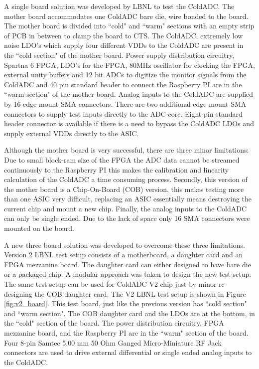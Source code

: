 \label{sec:2.4}


A single board solution was developed by LBNL to test the ColdADC. The mother board accommodates one ColdADC bare die, wire bonded to the board. The mother board is divided into ``cold" and ``warm" sections with an empty strip of PCB in between to clamp the board to CTS. The ColdADC, extremely low noise LDO's which supply four different VDDs to the ColdADC are present in the ``cold section" of the mother board. Power supply distribution circuitry, Spartna 6 FPGA, LDO's for the FPGA, 80MHz oscillator for clocking the FPGA, external unity buffers and 12 bit ADCs to digitize the monitor signals from the ColdADC and 40 pin standard header to connect the Raspberry PI are in the ``warm section" of the mother board. Analog inputs to the ColdADC are supplied by 16 edge-mount SMA connectors. There are two additional edge-mount SMA connectors to supply test inputs directly to the ADC-core. Eight-pin standard header connector is available if there is a need to bypass the ColdADC LDOs and supply external VDDs directly to the ASIC.

Although the mother board is very successful, there are three minor limitations: Due to small block-ram size of the FPGA the ADC data cannot be streamed continuously to the Raspberry PI this makes the calibration and linearity calculation of the ColdADC a time consuming process. Secondly, this version of the mother board is a Chip-On-Board (COB) version, this makes testing more than one ASIC very difficult, replacing an ASIC essentially means destroying the current chip and mount a new chip. Finally, the analog inputs to the ColdADC can only be single ended. Due to the lack of space only 16 SMA connectors were mounted on the board.  

A new three board solution was developed to overcome these three limitations. Version 2 LBNL test setup consists of a motherboard, a daughter card and an FPGA mezzanine board. The daughter card can either designed to have bare die or a packaged chip. A modular approach was taken to design the new test setup. The same test setup can be used for ColdADC V2 chip just by minor re-designing the COB daughter card. The V2 LBNL test setup is shown in Figure \ref{fig:v2_board}. This test board, just like the previous version has ``cold section" and ``warm section". The COB daughter card and the LDOs are at the bottom, in the ``cold" section of the board. The power distribution circuitry, FPGA mezzanine board, and the Raspberry PI are in the ``warm" section of the board. Four 8-pin Samtec 5.00 mm 50 Ohm Ganged Micro-Miniature RF Jack connectors are used to drive external differential or single ended analog inputs to the ColdADC.  

